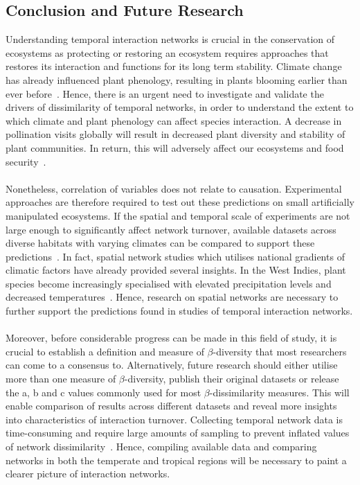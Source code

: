 \documentclass[11pt]{article}
\begin{document}
\subsection{Conclusion and Future Research}
Understanding temporal interaction networks is crucial in the conservation of ecosystems as protecting or restoring an ecosystem requires approaches that restores its interaction and functions for its long term stability. Climate change has already influenced plant phenology, resulting in plants blooming earlier than ever before~\citep{Cleland2007,Miller-Rushing2008}. Hence, there is an urgent need to investigate and validate the drivers of dissimilarity of temporal networks, in order to understand the extent to which climate and plant phenology can affect species interaction. A decrease in pollination visits globally will result in decreased plant diversity and stability of plant communities. In return, this will adversely affect our ecosystems and food security~\citep{Schweiger2010, Burkle2011}. \\
\\
Nonetheless, correlation of variables does not relate to causation. Experimental approaches are therefore required to test out these predictions on small artificially manipulated ecosystems. If the spatial and temporal scale of experiments are not large enough to significantly affect network turnover, available datasets across diverse habitats with varying climates can be compared to support these predictions~\citep{Burkle2009, Burkle2011}. In fact, spatial network studies which utilises national gradients of climatic factors have already provided several insights. In the West Indies, plant species become increasingly specialised with elevated precipitation levels and decreased temperatures~\citep{MartinGonzalez2009}. Hence, research on spatial networks are necessary to further support the predictions found in studies of temporal interaction networks.\\
\\
Moreover, before considerable progress can be made in this field of study, it is crucial to establish a definition and measure of $\beta$-diversity that most researchers can come to a consensus to. Alternatively, future research should either utilise more than one measure of $\beta$-diversity, publish their original datasets or release the a, b and c values commonly used for most $\beta$-dissimilarity measures. This will enable comparison of results across different datasets and reveal more insights into characteristics of interaction turnover. Collecting temporal network data is time-consuming and require large amounts of sampling to prevent inflated values of network dissimilarity~\citep{Koleff2003, Burkle2011, Poisot2015}. Hence, compiling available data and comparing networks in both the temperate and tropical regions will be necessary to paint a clearer picture of interaction networks. \\
\end{document}
